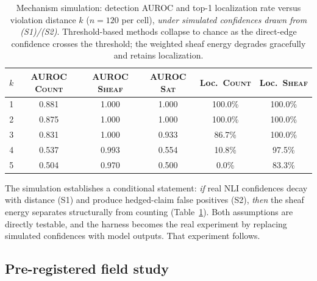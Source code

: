 \begin{table}[t]
\centering
\begin{tabular}{cccccc}
\toprule
$k$ & AUROC \textsc{Count} & AUROC \textsc{Sheaf} & AUROC \textsc{Sat} &
Loc.\ \textsc{Count} & Loc.\ \textsc{Sheaf}\\
\midrule
1 & 0.881 & 1.000 & 1.000 & 100.0\% & 100.0\%\\
2 & 0.875 & 1.000 & 1.000 & 100.0\% & 100.0\%\\
3 & 0.831 & 1.000 & 0.933 & 86.7\% & 100.0\%\\
4 & 0.537 & 0.993 & 0.554 & 10.8\% & 97.5\%\\
5 & 0.504 & 0.970 & 0.500 & 0.0\% & 83.3\%\\
\bottomrule
\end{tabular}
\caption{Mechanism simulation: detection AUROC and top-1 localization rate
versus violation distance $k$ ($n=120$ per cell), \emph{under simulated
confidences drawn from (S1)/(S2)}. Threshold-based methods collapse to chance
as the direct-edge confidence crosses the threshold; the weighted sheaf energy
degrades gracefully and retains localization.}
\label{tab:simulation}
\end{table}

The simulation establishes a conditional statement: \emph{if} real NLI
confidences decay with distance (S1) and produce hedged-claim false positives
(S2), \emph{then} the sheaf energy separates structurally from counting
(Table~\ref{tab:simulation}). Both assumptions are directly testable, and the
harness becomes the real experiment by replacing simulated confidences with
model outputs. That experiment follows.

\subsection{Pre-registered field study}
\label{sec:field}

